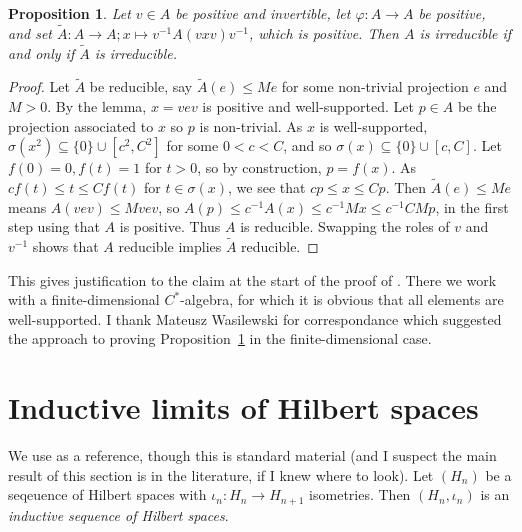 \documentclass[twoside,a4paper,12pt]{article}
\theoremstyle{plain}
\newtheorem{proposition}{Proposition}[section]
\theoremstyle{definition}
\begin{document}
\begin{proposition}\label{prop:twisting_irred}
Let $v\in A$ be positive and invertible, let $\varphi\colon A\to A$ be positive, and set $\tilde A \colon A\to A; x \mapsto v^{-1} A(vxv) v^{-1}$, which is positive.  Then $A$ is irreducible if and only if $\tilde A$ is irreducible.
\end{proposition}
\begin{proof}
Let $\tilde A$ be reducible, say $\tilde A(e) \leq M e$ for some non-trivial projection $e$ and $M>0$.  By the lemma, $x=vev$ is positive and well-supported.  Let $p\in A$ be the projection associated to $x$ so $p$ is non-trivial.  As $x$ is well-supported, $\sigma(x^2) \subseteq \{0\} \cup [c^2,C^2]$ for some $0<c<C$, and so $\sigma(x) \subseteq \{0\} \cup [c,C]$.  Let $f(0)=0, f(t)=1$ for $t>0$, so by construction, $p = f(x)$.  As $cf(t) \leq t \leq Cf(t)$ for $t\in\sigma(x)$, we see that $c p \leq x \leq Cp$.  Then $\tilde A(e) \leq Me$ means $A(vev) \leq M vev$, so $A(p) \leq c^{-1} A(x) \leq c^{-1} M x \leq c^{-1}CM p$, in the first step using that $A$ is positive.  Thus $A$ is reducible.  Swapping the roles of $v$ and $v^{-1}$ shows that $A$ reducible implies $\tilde A$ reducible.
\end{proof}

This gives justification to the claim at the start of the proof of \cite[Proposition~4.3]{cgw}.  There we work with a finite-dimensional $C^*$-algebra, for which it is obvious that all elements are well-supported.  I thank Mateusz Wasilewski for correspondance which suggested the approach to proving Proposition~\ref{prop:twisting_irred} in the finite-dimensional case.





\clearpage

\section{Inductive limits of Hilbert spaces}

We use \cite[Chapter~XIV]{tak3} as a reference, though this is standard material (and I suspect the main result of this section is in the literature, if I knew where to look).  Let $(H_n)$ be a seqeuence of Hilbert spaces with $\iota_n\colon H_n \to H_{n+1}$ isometries.  Then $(H_n,\iota_n)$ is an \emph{inductive sequence of Hilbert spaces}.
\end{document}
